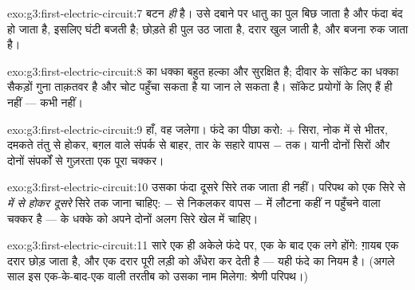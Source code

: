 \begin{solution}{exo:g3:first-electric-circuit:7}
बटन \emph{ही}  है। उसे दबाने पर धातु का पुल बिछ जाता है और फंदा
बंद हो जाता है, इसलिए घंटी बजती है; छोड़ते ही पुल उठ जाता है, दरार
खुल जाती है, और बजना रुक जाता है।
\end{solution}

\begin{solution}{exo:g3:first-electric-circuit:8}
 का धक्का बहुत हल्का और सुरक्षित है; दीवार के सॉकेट का धक्का
सैकड़ों गुना ताक़तवर है और चोट पहुँचा सकता है या जान ले सकता है।
सॉकेट प्रयोगों के लिए हैं ही नहीं --- कभी नहीं।
\end{solution}

\begin{solution}{exo:g3:first-electric-circuit:9}
हाँ, वह जलेगा। फंदे का पीछा करो: $+$ सिरा, नोक में से भीतर, दमकते
तंतु से होकर, बग़ल वाले संपर्क से बाहर, तार के सहारे वापस $-$ तक।
यानी दोनों सिरों और दोनों संपर्कों से गुज़रता एक पूरा चक्कर।
\end{solution}

\begin{solution}{exo:g3:first-electric-circuit:10}
उसका फंदा दूसरे सिरे तक जाता ही नहीं। परिपथ को एक सिरे से
\emph{ में से होकर दूसरे} सिरे तक जाना चाहिए: $-$ से निकलकर वापस
$-$ में लौटना कहीं न पहुँचने वाला चक्कर है ---  के धक्के को अपने
दोनों अलग सिरे खेल में चाहिए।
\end{solution}

\begin{solution}{exo:g3:first-electric-circuit:11}
सारे  एक ही अकेले फंदे पर, एक के बाद एक लगे होंगे: ग़ायब  एक
दरार छोड़ जाता है, और एक दरार पूरी लड़ी को अँधेरा कर देती है ---
यही फंदे का नियम है। (अगले साल इस एक-के-बाद-एक वाली तरतीब को उसका
नाम मिलेगा: श्रेणी परिपथ।)
\end{solution}
